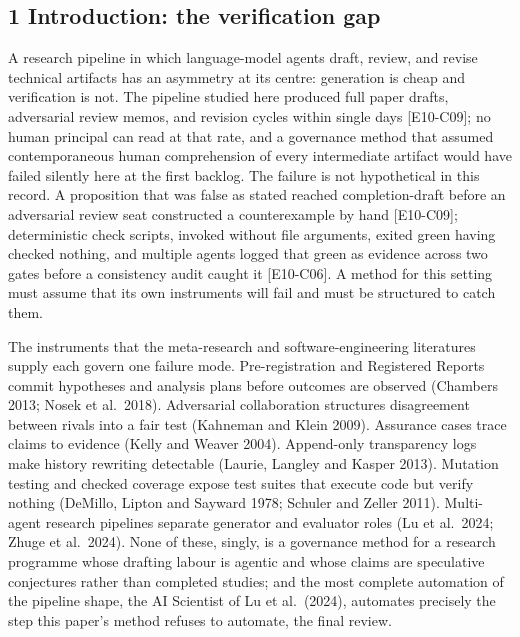 \documentclass[
  11pt,
]{article}
\begin{document}
\subsection{1 Introduction: the verification
gap}\label{introduction-the-verification-gap}

A research pipeline in which language-model agents draft, review, and
revise technical artifacts has an asymmetry at its centre: generation is
cheap and verification is not. The pipeline studied here produced full
paper drafts, adversarial review memos, and revision cycles within
single days {[}E10-C09{]}; no human principal can read at that rate, and
a governance method that assumed contemporaneous human comprehension of
every intermediate artifact would have failed silently here at the first
backlog. The failure is not hypothetical in this record. A proposition
that was false as stated reached completion-draft before an adversarial
review seat constructed a counterexample by hand {[}E10-C09{]};
deterministic check scripts, invoked without file arguments, exited
green having checked nothing, and multiple agents logged that green as
evidence across two gates before a consistency audit caught it
{[}E10-C06{]}. A method for this setting must assume that its own
instruments will fail and must be structured to catch them.

The instruments that the meta-research and software-engineering
literatures supply each govern one failure mode. Pre-registration and
Registered Reports commit hypotheses and analysis plans before outcomes
are observed (Chambers 2013; Nosek et al.~2018). Adversarial
collaboration structures disagreement between rivals into a fair test
(Kahneman and Klein 2009). Assurance cases trace claims to evidence
(Kelly and Weaver 2004). Append-only transparency logs make history
rewriting detectable (Laurie, Langley and Kasper 2013). Mutation testing
and checked coverage expose test suites that execute code but verify
nothing (DeMillo, Lipton and Sayward 1978; Schuler and Zeller 2011).
Multi-agent research pipelines separate generator and evaluator roles
(Lu et al.~2024; Zhuge et al.~2024). None of these, singly, is a
governance method for a research programme whose drafting labour is
agentic and whose claims are speculative conjectures rather than
completed studies; and the most complete automation of the pipeline
shape, the AI Scientist of Lu et al.~(2024), automates precisely the
step this paper's method refuses to automate, the final review.
\end{document}
